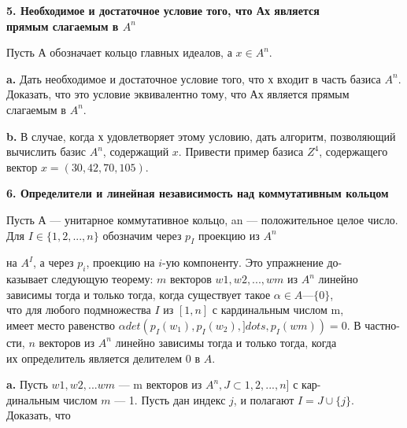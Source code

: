 \documentclass{../template/mai_book}
\begin{document}
\medskip

{\noindent\bf 5. Необходимое и достаточное условие того, что Ах является \\
прямым слагаемым в $A^n$}

\medskip

Пусть А обозначает кольцо главных идеалов, а $x \in A^n  $.

\medskip

{\bf a.} Дать необходимое и достаточное условие того, что х входит в 
часть базиса $A^n$. Доказать, что это условие эквивалентно тому, что Ах 
является прямым слагаемым в $A^n$.

\medskip

{\bf b.} В случае, когда х удовлетворяет этому условию, дать алгоритм, 
позволяющий вычислить базис $A^n$, содержащий $x$. Привести пример 
базиса $\mathit{Z}^4$, содержащего вектор $x = (30,42,70,105)$. 

\medskip

{\noindent\bf 6. Определители и линейная независимость
над коммутативным кольцом }

\medskip

Пусть А — унитарное коммутативное кольцо, an — положительное 
целое число. Для $I \in \{1,2,..., n\}$ обозначим через $p_I$ проекцию из $A^n$

\pagebreak

\noindent на $A^I$, а через $p_i$, проекцию на $\mathit{i}$-ую компоненту. Это упражнение до-\\казывает следующую теорему: $m$ векторов $ w1, w2,..., wm$ из $A^n$ линейно\\ 
зависимы тогда и только тогда, когда существует такое $\alpha \in A — \{0\}$,\\ что для любого подмножества $I$ из $[1,n]$ с кардинальным числом m,\\ 
имеет место равенство $\alpha det(p_I(w_1),p_I(w_2),]dots ,p_I( wm)) = 0$. В 
частно-\\сти, $n$ векторов из $A^n$ линейно зависимы тогда и только тогда, когда\\ 
их определитель является делителем 0 в $A$.

\medskip

{\bf a.} Пусть $w1, w2,... wm$ — m векторов из $A^n, J\subset 1,2,..., n]$ с 
кар-\\динальным числом $m$ — 1. Пусть дан индекс $j$, и полагают $I = J \cup \{j\}. $\\
Доказать, что

\medskip
\end{document}

